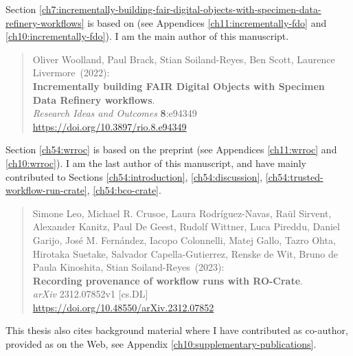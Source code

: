 Section \ref{ch7:incrementally-building-fair-digital-objects-with-specimen-data-refinery-workflows} is based on \cite{Woolland 2022} (see Appendices \ref{ch11:incrementally-fdo} and \ref{ch10:incrementally-fdo}). I am the main author of this manuscript.

\begin{quote}
    \small
    Oliver Woolland, Paul Brack, Stian Soiland-Reyes, Ben Scott, Laurence Livermore~(2022): \\
    \textbf{Incrementally building FAIR Digital Objects with Specimen Data Refinery workflows}.\\
    \emph{Research Ideas and Outcomes} \textbf{8}:e94349\\
    \url{https://doi.org/10.3897/rio.8.e94349}    
\end{quote}

Section \ref{ch54:wrroc} is based on the preprint \cite{Leo 2023b} (see Appendices \ref{ch11:wrroc} and \ref{ch10:wrroc}). I am the last author of this manuscript, and have mainly contributed to Sections \ref{ch54:introduction}, \ref{ch54:discussion}, \ref{ch54:trusted-workflow-run-crate}, \ref{ch54:bco-crate}.

\begin{quote}
    \small
    Simone Leo, Michael R. Crusoe, Laura Rodríguez-Navas, Raül Sirvent, Alexander Kanitz, Paul De Geest, Rudolf Wittner, Luca Pireddu, Daniel Garijo, José M. Fernández, Iacopo Colonnelli, Matej Gallo, Tazro Ohta, Hirotaka Suetake, Salvador Capella-Gutierrez, Renske de Wit, Bruno de Paula Kinoshita, Stian Soiland-Reyes~(2023): \\
    \textbf{Recording provenance of workflow runs with RO-Crate}.\\
    \emph{arXiv} 2312.07852v1 [cs.DL] \\
    \url{https://doi.org/10.48550/arXiv.2312.07852}\\
\end{quote}

This thesis also cites background material where I have contributed as co-author, provided as  on the Web, see Appendix \vref{ch10:supplementary-publications}.
